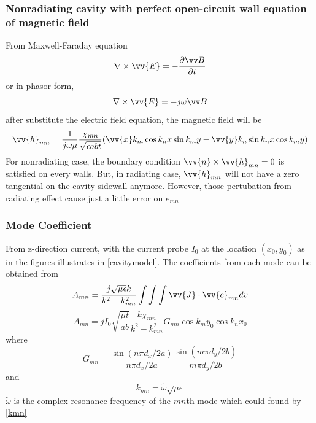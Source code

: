 \documentclass[11pt,a4paper]{article}
\begin{document}
      \subsubsection{Nonradiating cavity with perfect open-circuit wall equation of magnetic field}
        \indent From Maxwell-Faraday equation
        \begin{equation}
          \nabla \times \vv{E} = - \frac {\partial{\vv B}} {\partial t}
        \end{equation}
        \indent or in phasor form,
        \begin{equation}
          \nabla \times \vv{E} = -j\omega{\vv B}
        \end{equation}
        \indent after substitute the electric field equation, the magnetic field will be
        \begin{equation}
           \vv{h}_{mn} = \frac{1}{j\omega\mu}\frac{\chi_{mn}}{\sqrt{\epsilon abt}}(\vv{x}k_m\cos{k_nx}\sin{k_my} - \vv{y}k_n\sin{k_n}{x}\cos{k_m}{y})
        \end{equation}
        \indent For nonradiating case, the boundary condition $\vv{n} \times \vv{h}_{mn} = 0$ is satisfied on every walls.
                But, in radiating case, $\vv{h}_{mn}$ will not have a zero tangential on the cavity sidewall anymore.
                However, those pertubation from radiating effect cause just a little error on $e_{mn}$\cite{CaM:81}
      
      \subsubsection{Mode Coefficient}
        \indent From z-direction current, with the current probe $I_{0}$ at the location $(x_0,y_0)$ as in the
                figures illustrates in \ref{cavitymodel}. The coefficients from each mode can be obtained from
        \begin{equation}
          A_{mn} = \frac{j\sqrt{\mu\epsilon}k}{k^2-k_{mn}^2} \int\int\int\vv{J} \cdot \vv{e}_{mn} dv
        \end{equation}
        \begin{equation}
          \label{ModeCoeff}
          A_{mn} = jI_0 \sqrt{\frac{\mu t}{ab}} \frac{k\chi_{mn}}{k^2-k_{mn}^2} G_{mn} \cos{k_my_0}\cos{k_nx_0}
        \end{equation}
        \indent where
        \begin{equation}
          G_{mn} = \frac{\sin(n\pi d_x/2a)}{n\pi d_x/2a}\frac{\sin(m\pi d_y/2b)}{m\pi d_y/2b}
        \end{equation}
        \indent and
        \begin{equation}
          k_{mn} = \widetilde{\omega}\sqrt{\mu\epsilon}
        \end{equation}
        \indent $\widetilde{\omega}$ is the complex resonance frequency of the $mn$th mode which could found by \ref{kmn}
\end{document}
